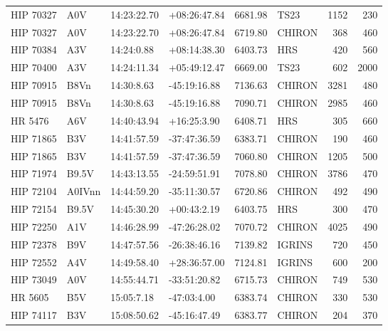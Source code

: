 \documentclass{emulateapj}
\begin{document}
\begin{longtable*}{|l|lllrlrr|}
   HIP 70327 &            A0V &    14:23:22.70 &   +08:26:47.84 &  6681.98 &       TS23 &     1152 &     230 \\
   HIP 70327 &            A0V &    14:23:22.70 &   +08:26:47.84 &  6719.80 &     CHIRON &      368 &     460 \\
   HIP 70384 &            A3V &     14:24:0.88 &   +08:14:38.30 &  6403.73 &        HRS &      420 &     560 \\
   HIP 70400 &            A3V &    14:24:11.34 &   +05:49:12.47 &  6669.00 &       TS23 &      602 &    2000 \\
   HIP 70915 &           B8Vn &     14:30:8.63 &   -45:19:16.88 &  7136.63 &     CHIRON &     3281 &     480 \\
   HIP 70915 &           B8Vn &     14:30:8.63 &   -45:19:16.88 &  7090.71 &     CHIRON &     2985 &     460 \\
     HR 5476 &            A6V &    14:40:43.94 &    +16:25:3.90 &  6408.71 &        HRS &      305 &     660 \\
   HIP 71865 &            B3V &    14:41:57.59 &   -37:47:36.59 &  6383.71 &     CHIRON &      190 &     460 \\
   HIP 71865 &            B3V &    14:41:57.59 &   -37:47:36.59 &  7060.80 &     CHIRON &     1205 &     500 \\
   HIP 71974 &          B9.5V &    14:43:13.55 &   -24:59:51.91 &  7078.80 &     CHIRON &     3786 &     470 \\
   HIP 72104 &         A0IVnn &    14:44:59.20 &   -35:11:30.57 &  6720.86 &     CHIRON &      492 &     490 \\
   HIP 72154 &          B9.5V &    14:45:30.20 &    +00:43:2.19 &  6403.75 &        HRS &      300 &     470 \\
   HIP 72250 &            A1V &    14:46:28.99 &   -47:26:28.02 &  7070.72 &     CHIRON &     4025 &     490 \\
   HIP 72378 &            B9V &    14:47:57.56 &   -26:38:46.16 &  7139.82 &     IGRINS &      720 &     450 \\
   HIP 72552 &            A4V &    14:49:58.40 &   +28:36:57.00 &  7124.81 &     IGRINS &      600 &     200 \\
   HIP 73049 &            A0V &    14:55:44.71 &   -33:51:20.82 &  6715.73 &     CHIRON &      749 &     530 \\
     HR 5605 &            B5V &     15:05:7.18 &    -47:03:4.00 &  6383.74 &     CHIRON &      330 &     530 \\
   HIP 74117 &            B3V &    15:08:50.62 &   -45:16:47.49 &  6383.77 &     CHIRON &      204 &     370 \\

\end{longtable*}
\end{document}
